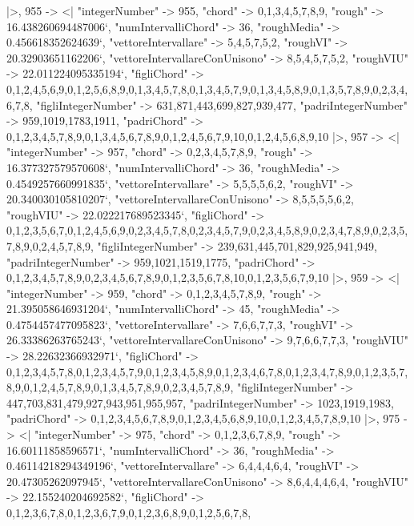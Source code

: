 \documentclass[
]{article}
\begin{document}
\begin{DatasetVerbatim}
  |>,
  955 -> <|
    "integerNumber" -> 955,
    "chord" -> {0,1,3,4,5,7,8,9},
    "rough" -> 16.438260694487006`,
    "numIntervalliChord" -> 36,
    "roughMedia" -> 0.456618352624639`,
    "vettoreIntervallare" -> {5,4,5,7,5,2},
    "roughVI" -> 20.32903651162206`,
    "vettoreIntervallareConUnisono" -> {8,5,4,5,7,5,2},
    "roughVIU" -> 22.011224095335194`,
    "figliChord" -> {{0,1,2,4,5,6,9},{0,1,2,5,6,8,9},{0,1,3,4,5,7,8},{0,1,3,4,5,7,9},{0,1,3,4,5,8,9},{0,1,3,5,7,8,9},{0,2,3,4,6,7,8}},
    "figliIntegerNumber" -> {631,871,443,699,827,939,477},
    "padriIntegerNumber" -> {959,1019,1783,1911},
    "padriChord" -> {{0,1,2,3,4,5,7,8,9},{0,1,3,4,5,6,7,8,9},{0,1,2,4,5,6,7,9,10},{0,1,2,4,5,6,8,9,10}}
  |>,
  957 -> <|
    "integerNumber" -> 957,
    "chord" -> {0,2,3,4,5,7,8,9},
    "rough" -> 16.377327579570608`,
    "numIntervalliChord" -> 36,
    "roughMedia" -> 0.4549257660991835`,
    "vettoreIntervallare" -> {5,5,5,5,6,2},
    "roughVI" -> 20.340030105810207`,
    "vettoreIntervallareConUnisono" -> {8,5,5,5,5,6,2},
    "roughVIU" -> 22.022217689523345`,
    "figliChord" -> {{0,1,2,3,5,6,7},{0,1,2,4,5,6,9},{0,2,3,4,5,7,8},{0,2,3,4,5,7,9},{0,2,3,4,5,8,9},{0,2,3,4,7,8,9},{0,2,3,5,7,8,9},{0,2,4,5,7,8,9}},
    "figliIntegerNumber" -> {239,631,445,701,829,925,941,949},
    "padriIntegerNumber" -> {959,1021,1519,1775},
    "padriChord" -> {{0,1,2,3,4,5,7,8,9},{0,2,3,4,5,6,7,8,9},{0,1,2,3,5,6,7,8,10},{0,1,2,3,5,6,7,9,10}}
  |>,
  959 -> <|
    "integerNumber" -> 959,
    "chord" -> {0,1,2,3,4,5,7,8,9},
    "rough" -> 21.395058646931204`,
    "numIntervalliChord" -> 45,
    "roughMedia" -> 0.4754457477095823`,
    "vettoreIntervallare" -> {7,6,6,7,7,3},
    "roughVI" -> 26.33386263765243`,
    "vettoreIntervallareConUnisono" -> {9,7,6,6,7,7,3},
    "roughVIU" -> 28.22632366932971`,
    "figliChord" -> {{0,1,2,3,4,5,7,8},{0,1,2,3,4,5,7,9},{0,1,2,3,4,5,8,9},{0,1,2,3,4,6,7,8},{0,1,2,3,4,7,8,9},{0,1,2,3,5,7,8,9},{0,1,2,4,5,7,8,9},{0,1,3,4,5,7,8,9},{0,2,3,4,5,7,8,9}},
    "figliIntegerNumber" -> {447,703,831,479,927,943,951,955,957},
    "padriIntegerNumber" -> {1023,1919,1983},
    "padriChord" -> {{0,1,2,3,4,5,6,7,8,9},{0,1,2,3,4,5,6,8,9,10},{0,1,2,3,4,5,7,8,9,10}}
  |>,
  975 -> <|
    "integerNumber" -> 975,
    "chord" -> {0,1,2,3,6,7,8,9},
    "rough" -> 16.60111858596571`,
    "numIntervalliChord" -> 36,
    "roughMedia" -> 0.46114218294349196`,
    "vettoreIntervallare" -> {6,4,4,4,6,4},
    "roughVI" -> 20.47305262097945`,
    "vettoreIntervallareConUnisono" -> {8,6,4,4,4,6,4},
    "roughVIU" -> 22.155240204692582`,
    "figliChord" -> {{0,1,2,3,6,7,8},{0,1,2,3,6,7,9},{0,1,2,3,6,8,9},{0,1,2,5,6,7,8}},

\end{DatasetVerbatim}
\end{document}
